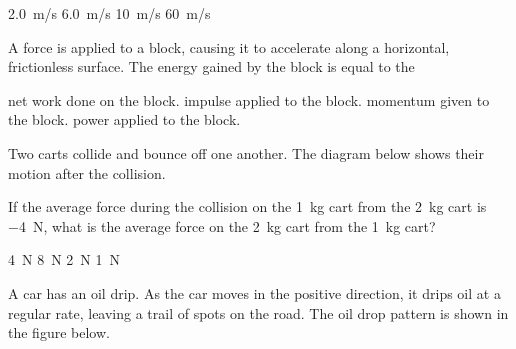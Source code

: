 \documentclass[]{exam}
\begin{document}
\begin{questions}
\begin{randomizechoices}
    \choice \SI{2.0}{m/s}
    \choice \SI{6.0}{m/s}
    \correctchoice \SI{10}{m/s}
    \choice \SI{60}{m/s}
\end{randomizechoices}

\question
A force is applied to a block, causing it to accelerate along a horizontal, frictionless surface. The energy gained by the block is equal to the

\begin{randomizechoices}
    \correctchoice net work done on the block.
    \choice impulse applied to the block.
    \choice momentum given to the block.
    \choice power applied to the block.
\end{randomizechoices}

\question
Two carts collide and bounce off one another. The diagram below shows their motion after the collision.


\begin{center}
\end{center}

If the average force during the collision on the \SI{1}{kg} cart from the \SI{2}{kg} cart is \SI{-4}{N}, what is the average force on the \SI{2}{kg} cart from the \SI{1}{kg} cart?

\begin{randomizechoices}
    \correctchoice \SI{4}{N}
    \choice \SI{8}{N}
    \choice \SI{2}{N}
    \choice \SI{1}{N}
\end{randomizechoices}

\clearpage

\question
A car has an oil drip. As the car moves in the positive direction, it drips oil at a regular rate, leaving a trail of spots on the road. The oil drop pattern is shown in the figure below.


\end{questions}
\end{document}
